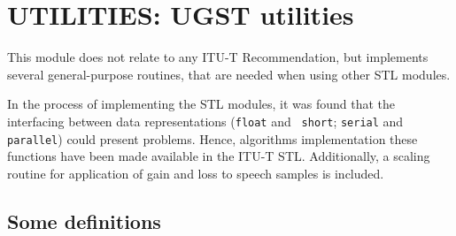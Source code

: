 
\chapter{UTILITIES: UGST utilities}

This module does not relate to any ITU-T Recommendation, but implements
several general-purpose routines, that are needed when using other
STL modules.

In the process of implementing the STL modules, it was found that
the interfacing between data representations ({\tt float} and {\tt
short}; {\tt serial} and {\tt parallel}) could present problems. Hence,
algorithms implementation these functions have been made available in the
ITU-T STL. Additionally, a scaling routine for application of gain and
loss to speech samples is included.

\section{Some definitions} \label{def:serial-parallel}


